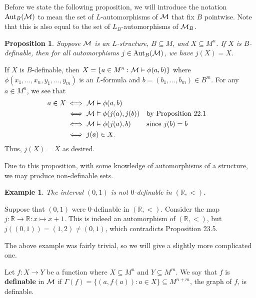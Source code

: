 \documentclass[10pt]{article}
\makeatletter
\newcommand{\R}{\mathbb{R}}
\DeclareMathOperator{\Aut}{Aut}
\theoremstyle{newstyle}
\newtheorem{prop}[thm]{Proposition}
\newtheorem{exmp}[thm]{Example}
\newenvironment{pf}[1][\proofname]{\par
  \pushQED{\qed}%
  \normalfont \topsep0\p@\relax
  \trivlist
  \item[\hskip\labelsep\scshape
  #1\@addpunct{.}]\ignorespaces
}{%
  \popQED\endtrivlist\@endpefalse
}
\makeatother
\begin{document}
Before we state the following proposition, we will introduce the notation $\Aut_B({\cal M})$ 
to mean the set of $L$-automorphisms of ${\cal M}$ that fix $B$ pointwise. Note that 
this is also equal to the set of $L_B$-automorphisms of ${\cal M}_B$. 

\begin{prop}
Suppose ${\cal M}$ is an $L$-structure, $B \subseteq M$, and $X \subseteq M^n$. 
If $X$ is $B$-definable, then for all automorphisms $j \in \Aut_B({\cal M})$, 
we have $j(X) = X$. 
\end{prop}
\begin{pf}
If $X$ is $B$-definable, then $X = \{a \in M^n : {\cal M} \vDash \phi(a, b)\}$
where $\phi(x_1, \dots, x_n, y_1, \dots, y_m)$ is an $L$-formula and $b = (b_1, \dots, b_m) \in B^m$. 
For any $a \in M^n$, we see that 
\begin{align*}
    a \in X &\iff {\cal M} \vDash \phi(a, b) \\ 
    &\iff {\cal M} \vDash \phi(j(a), j(b)) && \text{by Proposition 22.1} \\ 
    &\iff {\cal M} \vDash \phi(j(a), b) && \text{since $j(b) = b$} \\ 
    &\iff j(a) \in X.
\end{align*}
Thus, $j(X) = X$ as desired.
\end{pf}

Due to this proposition, with some knowledge of 
automorphisms of a structure, we may produce non-definable sets. 

\begin{exmp}
The interval $(0, 1)$ is not $0$-definable in $(\R, <)$. 
\end{exmp}
\begin{pf}
Suppose that $(0, 1)$ were $0$-definable in $(\R, <)$. Consider the map $j : \R \to \R : 
x \mapsto x+1$. This is indeed an automorphism of $(\R, <)$, but 
$j((0, 1)) = (1, 2) \neq (0, 1)$, which contradicts Proposition 23.5.
\end{pf}

The above example was fairly trivial, so we will give a slightly more complicated one.

Let $f : X \to Y$ be a function where $X \subseteq M^n$ and $Y \subseteq M^m$. We say that 
$f$ is {\bf definable} in ${\cal M}$ if $\Gamma(f) = \{(a, f(a)) : a \in X\} \subseteq M^{n+m}$, 
the graph of $f$, is definable.
\end{document}
